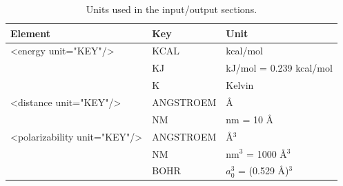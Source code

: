\documentclass[12pt]{article}
\begin{document}
\begin{table}[H]
 \newcommand{\rowsep}{2mm}
 \def\arraystretch{0.8}
 \caption{Units used in the input/output sections.}
 \label{tab:input2}
  \begin{threeparttable}
  \begin{tabularx}{\textwidth}{p{6cm}p{3.5cm}l}
  \hline
  \textbf{Element}	&	\textbf{Key}	& Unit\\ \hline
<energy unit="KEY"/>	&	KCAL	 & kcal/mol\\
                        &       KJ       & kJ/mol = 0.239 kcal/mol\\
                        &       K        & Kelvin\\
<distance unit="KEY"/>	&	ANGSTROEM & \AA	\\
		        &	NM	  & nm = 10 \AA \\
<polarizability unit="KEY"/>	& ANGSTROEM & \AA$^3$ \\
				&	NM  & nm$^3$ = 1000 \AA$^3$ \\  
				&  BOHR     & $a_0^3$ = (0.529 \AA)$^3$ \\
				\hline
  \end{tabularx}
  \end{threeparttable}
\end{table}
\end{document}
